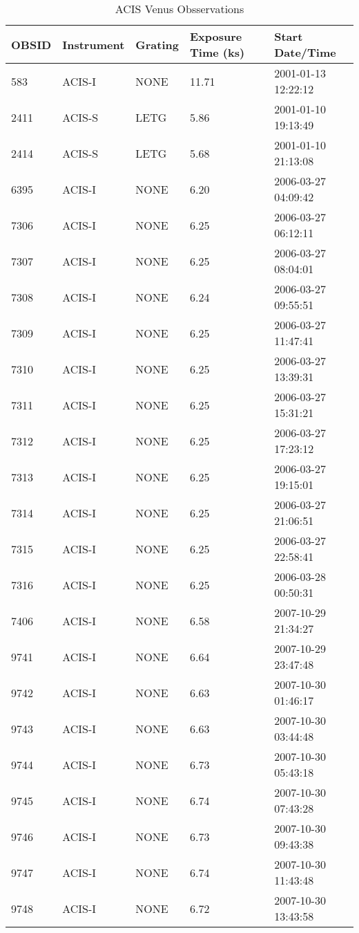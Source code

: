 \begin{table*}
\caption{ACIS Venus Obsservations\label{tab:venus_obsids}}
\begin{center}
\begin{tabular}{lllll}
\hline
\hline
OBSID & Instrument & Grating & Exposure Time (ks) & Start Date/Time \\
\hline
583	  & ACIS-I & NONE	& 11.71	& 2001-01-13 12:22:12 \\
2411  & ACIS-S & LETG	& 5.86  &	2001-01-10 19:13:49 \\
2414  & ACIS-S & LETG	& 5.68	& 2001-01-10 21:13:08 \\
6395  & ACIS-I & NONE	& 6.20	& 2006-03-27 04:09:42 \\
7306  & ACIS-I & NONE	& 6.25	& 2006-03-27 06:12:11 \\
7307  & ACIS-I & NONE	& 6.25	& 2006-03-27 08:04:01 \\
7308  & ACIS-I & NONE	& 6.24	& 2006-03-27 09:55:51 \\
7309  & ACIS-I & NONE	& 6.25	& 2006-03-27 11:47:41 \\
7310  & ACIS-I & NONE	& 6.25	& 2006-03-27 13:39:31 \\
7311  & ACIS-I & NONE	& 6.25	& 2006-03-27 15:31:21 \\
7312  & ACIS-I & NONE	& 6.25	& 2006-03-27 17:23:12 \\
7313  & ACIS-I & NONE	& 6.25	& 2006-03-27 19:15:01 \\
7314  & ACIS-I & NONE	& 6.25	& 2006-03-27 21:06:51 \\
7315	& ACIS-I & NONE	& 6.25	& 2006-03-27 22:58:41 \\
7316	& ACIS-I & NONE	& 6.25	& 2006-03-28 00:50:31 \\
7406	& ACIS-I & NONE	& 6.58	& 2007-10-29 21:34:27 \\
9741	& ACIS-I & NONE	& 6.64	& 2007-10-29 23:47:48 \\
9742	& ACIS-I & NONE	& 6.63	& 2007-10-30 01:46:17 \\
9743	& ACIS-I & NONE	& 6.63	& 2007-10-30 03:44:48 \\
9744	& ACIS-I & NONE	& 6.73	& 2007-10-30 05:43:18 \\
9745	& ACIS-I & NONE	& 6.74	& 2007-10-30 07:43:28 \\
9746	& ACIS-I & NONE	& 6.73	& 2007-10-30 09:43:38 \\
9747	& ACIS-I & NONE	& 6.74	& 2007-10-30 11:43:48 \\
9748	& ACIS-I & NONE	& 6.72	& 2007-10-30 13:43:58 \\

\end{tabular}
\end{center}
\end{table*}
